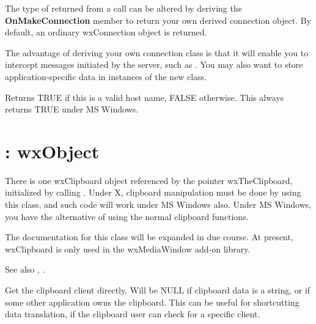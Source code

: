 \label{wxclientonmakeconnection}


The type of  returned from a  call can
be altered by deriving the {\bf OnMakeConnection} member to return your
own derived connection object. By default, an ordinary wxConnection
object is returned.

The advantage of deriving your own connection class is that it will
enable you to intercept messages initiated by the server, such
as . You may also want to
store application-specific data in instances of the new class.



Returns TRUE if this is a valid host name, FALSE otherwise. This always
returns TRUE under MS Windows.

\section{: wxObject}\label{wxclipboard}

There is one wxClipboard object referenced by the pointer
wxTheClipboard, initialized by calling .
Under X, clipboard manipulation must be done by using this class, and
such code will work under MS Windows also. Under MS Windows, you have the
alternative of using the normal clipboard functions.

The documentation for this class will be expanded in due course. At present,
wxClipboard is only used in the wxMediaWindow add-on library.

See also , .



Get the clipboard client directly. Will be NULL if clipboard data
is a string, or if some other application owns the clipboard. 
This can be useful for shortcutting data translation, if the
clipboard user can check for a specific client.


